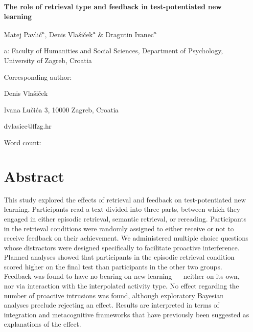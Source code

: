 \documentclass[12pt]{article}
\def\biblio{}
\begin{document}
\begin{titlepage}
    \begin{center}

        \vspace*{\fill}

        \Large
        \textbf{The role of retrieval type and feedback in test-potentiated 
        new learning}
        \normalsize

        \bigskip
        Matej Pavlić\textsuperscript{a}, Denis Vlašiček\textsuperscript{a} 
        \& Dragutin Ivanec\textsuperscript{a}

        a: Faculty of Humanities and Social Sciences, Department of 
        Psychology, University of Zagreb, Croatia

        \bigskip

        \raggedright
        Corresponding author:

        Denis Vlašiček

        Ivana Lučića 3, 10000 Zagreb, Croatia

        dvlasice@ffzg.hr

		\bigskip
		Word count:
		
        \vspace*{\fill}

    \end{center}

\end{titlepage}

\def\biblio{}

\section{Abstract}

This study explored the effects of retrieval and feedback on 
test-potentiated new learning. Participants read a text divided into three 
parts, between which they engaged in either episodic retrieval, semantic 
retrieval, or rereading. Participants in the retrieval conditions were 
randomly assigned to either receive or not to receive feedback on their 
achievement. We administered multiple choice questions whose distractors 
were designed specifically to facilitate proactive interference. Planned 
analyses showed that participants in the episodic retrieval condition scored 
higher on the final test than participants in the other two groups. Feedback 
was found to have no bearing on new learning --- neither on its own, nor via 
interaction with the interpolated activity type. No effect regarding the 
number of proactive intrusions was found, although exploratory Bayesian 
analyses preclude rejecting an effect. Results are interpreted in terms of 
integration and metacognitive frameworks that have previously been suggested 
as explanations of the effect.
\end{document}
